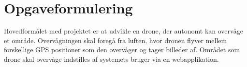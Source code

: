 \chapter{Opgaveformulering}
\label{chap:opgaveformulering}

Hovedformålet med projektet er at udvikle en drone, der autonomt kan overvåge et område. Overvågningen skal foregå fra luften, hvor dronen flyver mellem forskellige GPS positioner som den overvåger og tager billeder af. Området som drone skal overvåge indstilles af systemets bruger via en webapplikation.


